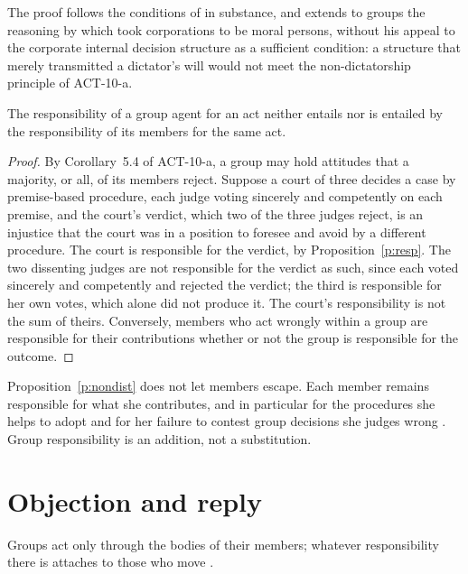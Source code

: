 \documentclass{situationist-preprint}
\begin{document}
The proof follows the conditions of \citet[ch.~7]{ListPettit2011} in substance, and extends to groups the reasoning by which \citet{French1979} took corporations to be moral persons, without his appeal to the corporate internal decision structure as a sufficient condition: a structure that merely transmitted a dictator's will would not meet the non-dictatorship principle of ACT-10-a.

\begin{proposition}\label{p:nondist}
The responsibility of a group agent for an act neither entails nor is entailed by the responsibility of its members for the same act.
\end{proposition}

\begin{proof}
By Corollary~5.4 of ACT-10-a, a group may hold attitudes that a majority, or all, of its members reject. Suppose a court of three decides a case by premise-based procedure, each judge voting sincerely and competently on each premise, and the court's verdict, which two of the three judges reject, is an injustice that the court was in a position to foresee and avoid by a different procedure. The court is responsible for the verdict, by Proposition~\ref{p:resp}. The two dissenting judges are not responsible for the verdict as such, since each voted sincerely and competently and rejected the verdict; the third is responsible for her own votes, which alone did not produce it. The court's responsibility is not the sum of theirs. Conversely, members who act wrongly within a group are responsible for their contributions whether or not the group is responsible for the outcome.
\end{proof}

Proposition~\ref{p:nondist} does not let members escape. Each member remains responsible for what she contributes, and in particular for the procedures she helps to adopt and for her failure to contest group decisions she judges wrong \citep{ListPettit2011}. Group responsibility is an addition, not a substitution.

\section{Objection and reply}

\begin{objection}
Groups act only through the bodies of their members; whatever responsibility there is attaches to those who move \citep{Velasquez1983}.
\end{objection}
\end{document}
